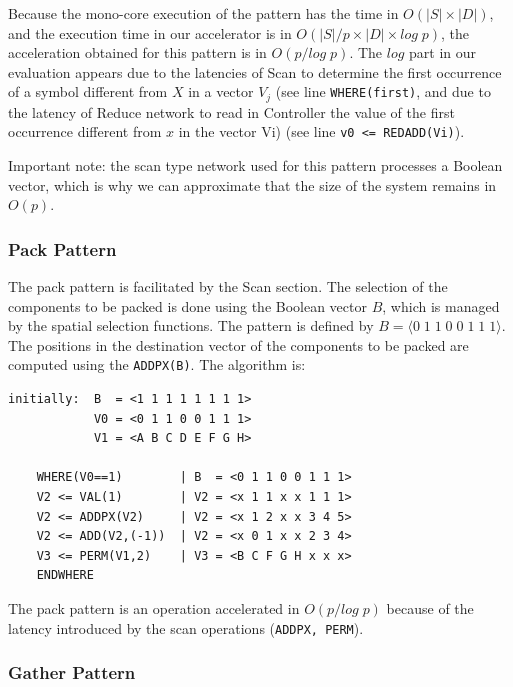 Because the mono-core execution of the pattern has the time in $O(|S| \times |D|)$, and the execution time in our accelerator is in $O(|S|/p \times |D| \times log \; p)$, the acceleration obtained for this pattern is in $O(p/log \; p)$. The  $log$ part in our evaluation appears due to the latencies of Scan to determine the first occurrence of a symbol different from $X$ in a vector $V_j$ (see line {\tt WHERE(first)}, and due to the latency of Reduce network to read in Controller the value of the first occurrence different from $x$ in the vector Vi) (see line {\tt v0 <= REDADD(Vi)}).

Important note: the scan type network used for this pattern processes a Boolean vector, which is why we can approximate that the size of the system remains in $O(p)$.

\subsubsection{Pack Pattern}

The pack pattern is facilitated by the Scan section. The selection of the components to be packed is done using the Boolean vector $B$, which is managed by the spatial selection functions. The pattern is defined by  $B = \langle 0 \; 1\; 1\; 0\; 0\; 1\; 1\; 1 \rangle$. The positions in the destination vector of the components to be packed   are computed using the {\tt ADDPX(B)}. The algorithm is:
\begin{verbatim}
initially:  B  = <1 1 1 1 1 1 1 1>
            V0 = <0 1 1 0 0 1 1 1>
            V1 = <A B C D E F G H>

    WHERE(V0==1)        | B  = <0 1 1 0 0 1 1 1>
    V2 <= VAL(1)        | V2 = <x 1 1 x x 1 1 1>
    V2 <= ADDPX(V2)     | V2 = <x 1 2 x x 3 4 5>
    V2 <= ADD(V2,(-1))  | V2 = <x 0 1 x x 2 3 4>
    V3 <= PERM(V1,2)    | V3 = <B C F G H x x x>
    ENDWHERE
\end{verbatim}

The pack pattern is an operation accelerated in $O(p/log \; p)$ because of the latency introduced by the scan operations ({\tt ADDPX, PERM}).

\subsubsection{Gather  Pattern}

